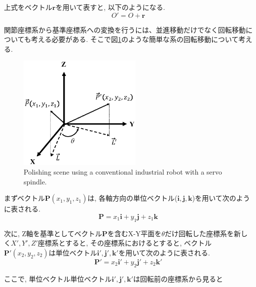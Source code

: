\documentclass{suribt}
\begin{document}
上式をベクトル${\bm r}$を用いて表すと, 以下のようになる.
\begin{equation}
	\label{O-O'translation}
	O' = O + {\bm r}
\end{equation}

関節座標系から基準座標系への変換を行うには、並進移動だけでなく回転移動についても考える必要がある. そこで図\ref{fig:1rink}のような簡単な系の回転移動について考える.
\begin{figure}[ht]
 \begin{center}
  \includegraphics[width=60mm,clip]{./figure/1rink.eps}
  \caption{Polishing scene using a conventional industrial robot with a servo spindle.}
  \label{fig:1rink}
 \end{center}
\end{figure}

 まずベクトル${\bm P}(x_1, y_1, z_1)$は, 各軸方向の単位ベクトル(${\bm i}, {\bm j}, {\bm k}$)を用いて次のように表される.
\begin{equation}
	\label{Pvector}
	{\bm P} = x_1{\bm i} + y_1{\bm j} + z_1{\bm k}
\end{equation}

次に, Z軸を基準としてベクトル${\bm P}$を含むX-Y平面を$\theta$だけ回転した座標系を新しく$X', Y', Z'$座標系とすると, その座標系におけるとすると, ベクトル${\bm P'}(x_2, y_2, z_2)$は単位ベクトル${\bm i'}, {\bm j'}, {\bm k'}$を用いて次のように表される.
\begin{equation}
	\label{P'vector}
	{\bm P'} = x_2{\bm i'} + y_2{\bm j'} + z_2{\bm k'}
\end{equation}

ここで, 単位ベクトル単位ベクトル${\bm i'}, {\bm j'}, {\bm k'}$は回転前の座標系から見ると
\end{document}
